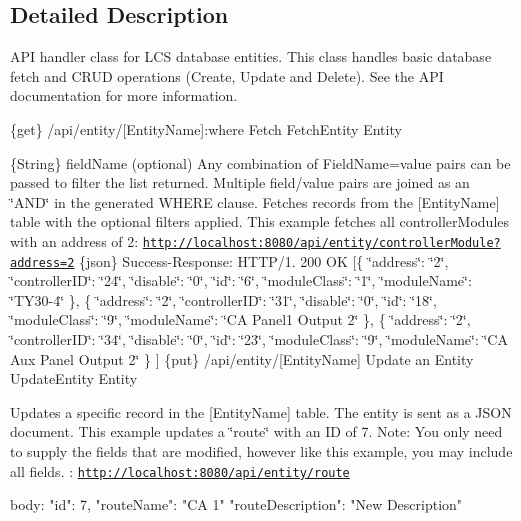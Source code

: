 \subsection{Detailed Description}
A\+PI handler class for L\+CS database entities. This class handles basic database fetch and C\+R\+UD operations (Create, Update and Delete). See the A\+PI documentation for more information. 

\{get\} /api/entity/\mbox{[}Entity\+Name\mbox{]}\+:where Fetch  Fetch\+Entity  Entity

\{String\} field\+Name (optional) Any combination of Field\+Name=value pairs can be passed to filter the list returned. Multiple field/value pairs are joined as an \char`\"{}\+A\+N\+D\char`\"{} in the generated W\+H\+E\+RE clause.  Fetches records from the \mbox{[}Entity\+Name\mbox{]} table with the optional filters applied.  This example fetches all controller\+Modules with an address of 2\+: \href{http://localhost:8080/api/entity/controllerModule?address=2}{\tt http\+://localhost\+:8080/api/entity/controller\+Module?address=2}  \{json\} Success-\/\+Response\+: H\+T\+T\+P/1. 200 OK \mbox{[}\{ \char`\"{}address\char`\"{}\+: \char`\"{}2\char`\"{}, \char`\"{}controller\+I\+D\char`\"{}\+: \char`\"{}24\char`\"{}, \char`\"{}disable\char`\"{}\+: \char`\"{}0\char`\"{}, \char`\"{}id\char`\"{}\+: \char`\"{}6\char`\"{}, \char`\"{}module\+Class\char`\"{}\+: \char`\"{}1\char`\"{}, \char`\"{}module\+Name\char`\"{}\+: \char`\"{}\+T\+Y30-\/4\char`\"{} \}, \{ \char`\"{}address\char`\"{}\+: \char`\"{}2\char`\"{}, \char`\"{}controller\+I\+D\char`\"{}\+: \char`\"{}31\char`\"{}, \char`\"{}disable\char`\"{}\+: \char`\"{}0\char`\"{}, \char`\"{}id\char`\"{}\+: \char`\"{}18\char`\"{}, \char`\"{}module\+Class\char`\"{}\+: \char`\"{}9\char`\"{}, \char`\"{}module\+Name\char`\"{}\+: \char`\"{}\+C\+A Panel1 Output 2\char`\"{} \}, \{ \char`\"{}address\char`\"{}\+: \char`\"{}2\char`\"{}, \char`\"{}controller\+I\+D\char`\"{}\+: \char`\"{}34\char`\"{}, \char`\"{}disable\char`\"{}\+: \char`\"{}0\char`\"{}, \char`\"{}id\char`\"{}\+: \char`\"{}23\char`\"{}, \char`\"{}module\+Class\char`\"{}\+: \char`\"{}9\char`\"{}, \char`\"{}module\+Name\char`\"{}\+: \char`\"{}\+C\+A Aux Panel Output 2\char`\"{} \} \mbox{]}  \{put\} /api/entity/\mbox{[}Entity\+Name\mbox{]} Update an Entity  Update\+Entity  Entity

Updates a specific record in the \mbox{[}Entity\+Name\mbox{]} table. The entity is sent as a J\+S\+ON document.  This example updates a \char`\"{}route\char`\"{} with an ID of 7. Note\+: You only need to supply the fields that are modified, however like this example, you may include all fields. \+: \href{http://localhost:8080/api/entity/route}{\tt http\+://localhost\+:8080/api/entity/route} \begin{DoxyVerb}body:
{
  "id": 7,
  "routeName": "CA 1"
  "routeDescription": "New Description"
}\end{DoxyVerb}


